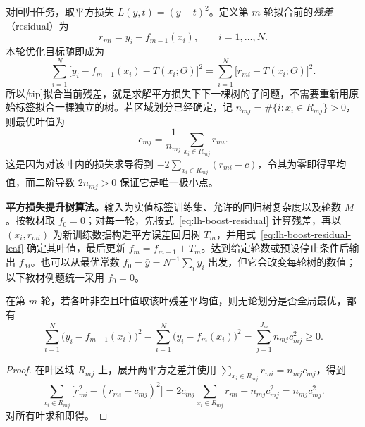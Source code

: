 对回归任务，取平方损失 $L(y,t)=(y-t)^2$。定义第 $m$ 轮拟合前的\emph{残差}（residual）为
\begin{equation}
 r_{mi}=y_i-f_{m-1}(x_i),\qquad i=1,\ldots,N.
 \label{eq:lh-boost-residual}
\end{equation}
本轮优化目标随即成为
\begin{equation}
 \sum_{i=1}^{N}\bigl[y_i-f_{m-1}(x_i)-T(x_i;\Theta)\bigr]^2
 =\sum_{i=1}^{N}\bigl[r_{mi}-T(x_i;\Theta)\bigr]^2.
 \label{eq:lh-boost-residual-objective}
\end{equation}
所以\emph[tip]{拟合当前残差，就是求解平方损失下下一棵树的子问题}，不需要重新用原始标签拟合一棵独立的树。若区域划分已经确定，记 $n_{mj}=\#\{i:x_i\in R_{mj}\}>0$，则最优叶值为
\begin{equation}
 c_{mj}=\frac1{n_{mj}}\sum_{x_i\in R_{mj}}r_{mi}.
 \label{eq:lh-boost-residual-leaf}
\end{equation}
这是因为对该叶内的损失求导得到 $-2\sum_{x_i\in R_{mj}}(r_{mi}-c)$，令其为零即得平均值，而二阶导数 $2n_{mj}>0$ 保证它是唯一极小点。

\textbf{平方损失提升树算法。}输入为实值标签训练集、允许的回归树复杂度以及轮数 $M$。按教材取 $f_0=0$；对每一轮，先按式~\eqref{eq:lh-boost-residual} 计算残差，再以 $(x_i,r_{mi})$ 为新训练数据构造平方误差回归树 $T_m$，并用式~\eqref{eq:lh-boost-residual-leaf} 确定其叶值，最后更新 $f_m=f_{m-1}+T_m$。达到给定轮数或预设停止条件后输出 $f_M$。也可以从最优常数 $f_0=\bar y=N^{-1}\sum_i y_i$ 出发，但它会改变每轮树的数值；以下教材例题统一采用 $f_0=0$。

\begin{proposition}
\label{prop:lh-boost-squared-decrease}
在第 $m$ 轮，若各叶非空且叶值取该叶残差平均值，则无论划分是否全局最优，都有
\begin{equation}
 \sum_{i=1}^{N}\bigl(y_i-f_{m-1}(x_i)\bigr)^2
 -\sum_{i=1}^{N}\bigl(y_i-f_m(x_i)\bigr)^2
 =\sum_{j=1}^{J_m}n_{mj}c_{mj}^2\geq0.
 \label{eq:lh-boost-squared-decrease}
\end{equation}
\end{proposition}
\begin{proof}
在叶区域 $R_{mj}$ 上，展开两平方之差并使用 $\sum_{x_i\in R_{mj}}r_{mi}=n_{mj}c_{mj}$，得到
\[
 \sum_{x_i\in R_{mj}}\bigl[r_{mi}^2-(r_{mi}-c_{mj})^2\bigr]
 =2c_{mj}\sum_{x_i\in R_{mj}}r_{mi}-n_{mj}c_{mj}^2
 =n_{mj}c_{mj}^2.
\]
对所有叶求和即得。
\end{proof}

